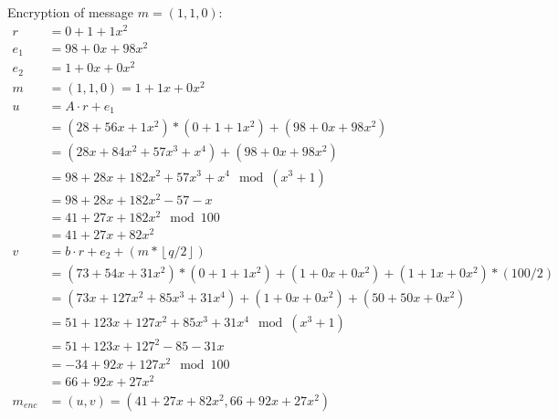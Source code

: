 Encryption of message $m=(1,1,0)$:
\begin{align*}
  r       & =0 + 1 + 1x^2                                                                    \\
  e_1     & =98 + 0x + 98x^2                                                                 \\
  e_2     & =1 + 0x + 0x^2                                                                   \\
  m       & = (1, 1, 0) = 1+ 1x+ 0x^2                                                        \\
  u       & = A \cdot r + e_1                                                                \\
          & = (28 + 56x + 1x^2)*(0 + 1 + 1x^2) + (98 + 0x + 98x^2)                           \\
          & = (28x+84x^2+57x^3+x^4) + (98 + 0x + 98x^2)                                      \\
          & = 98+28x+182x^2+57x^3+x^4 \mod (x^3+1)                                           \\
          & = 98+28x+182x^2-57-x                                                             \\
          & = 41+27x+182x^2  \mod 100                                                        \\
          & = 41+27x+82x^2                                                                   \\
  v       & = b \cdot r + e_2 + (m*\left\lfloor q/2\right\rfloor)                            \\
          & = (73 + 54x + 31x^2) * (0 + 1 + 1x^2) + (1 + 0x + 0x^2) +  (1+ 1x+ 0x^2)*(100/2) \\
          & = (73x + 127x^2 + 85x^3 + 31x^4) + (1 + 0x + 0x^2) +  (50+ 50x+ 0x^2)            \\
          & = 51 + 123x + 127x^2 + 85x^3 + 31x^4 \mod (x^3+1)                                \\
          & = 51 + 123x + 127^2 - 85 - 31x                                                   \\
          & = -34 + 92x + 127x^2 \mod 100                                                    \\
          & = 66 + 92x + 27x^2                                                               \\
  m_{enc} & = (u,v) = (41+27x+82x^2, 66 + 92x + 27x^2)                                       \\
\end{align*}

